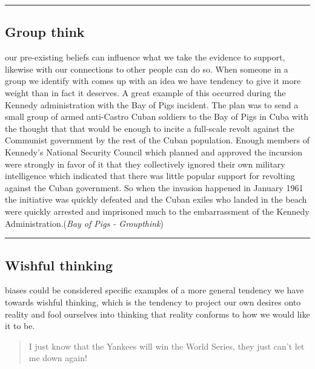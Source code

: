 \documentclass[justified]{tufte-book}
\newenvironment{argument}{\begin{quote}\normalsize}{\end{quote}}
\begin{document}
\begin{center}\rule{0.5\linewidth}{\linethickness}\end{center}

\hypertarget{group-think}{%
\subsection*{Group think}\label{group-think}}

 our pre-existing beliefs can influence what we take the evidence to support, likewise with our connections to other people can do so. When someone in a group we identify with comes up with an idea we have tendency to give it more weight than in fact it deserves. A great example of this occurred during the Kennedy administration with the Bay of Pigs incident. The plan was to send a small group of armed anti-Castro Cuban soldiers to the Bay of Pigs in Cuba with the thought that that would be enough to incite a full-scale revolt against the Communist government by the rest of the Cuban population. Enough members of Kennedy's National Security Council which planned and approved the incursion were strongly in favor of it that they collectively ignored their own military intelligence which indicated that there was little popular support for revolting against the Cuban government. So when the invasion happened in January 1961 the initiative was quickly defeated and the Cuban exiles who landed in the beach were quickly arrested and imprisoned much to the embarrassment of the Kennedy Administration.(\emph{Bay of Pigs - Groupthink})

\begin{center}\rule{0.5\linewidth}{\linethickness}\end{center}

\hypertarget{wishful-thinking}{%
\subsection*{Wishful thinking}\label{wishful-thinking}}

 biases could be considered specific examples of a more general tendency we have towards wishful thinking, which is the tendency to project our own desires onto reality and fool ourselves into thinking that reality conforms to how we would like it to be.

\begin{argument}
I just know that the Yankees will win the World Series, they just can't
let me down again!
\end{argument}
\end{document}
